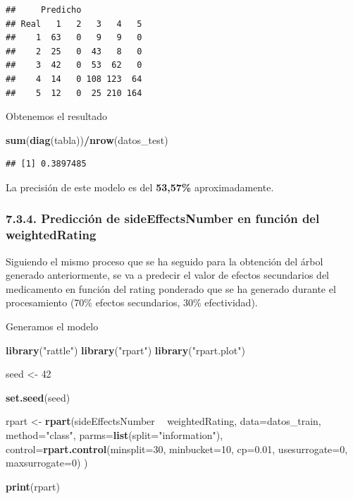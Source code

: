 \documentclass[spanish,]{article}
\newenvironment{Shaded}{\begin{snugshade}}{\end{snugshade}}
\newcommand{\KeywordTok}[1]{\textcolor[rgb]{0.13,0.29,0.53}{\textbf{#1}}}
\newcommand{\DataTypeTok}[1]{\textcolor[rgb]{0.13,0.29,0.53}{#1}}
\newcommand{\DecValTok}[1]{\textcolor[rgb]{0.00,0.00,0.81}{#1}}
\newcommand{\FloatTok}[1]{\textcolor[rgb]{0.00,0.00,0.81}{#1}}
\newcommand{\StringTok}[1]{\textcolor[rgb]{0.31,0.60,0.02}{#1}}
\newcommand{\OperatorTok}[1]{\textcolor[rgb]{0.81,0.36,0.00}{\textbf{#1}}}
\newcommand{\NormalTok}[1]{#1}
\begin{document}
\begin{verbatim}
##     Predicho
## Real   1   2   3   4   5
##    1  63   0   9   9   0
##    2  25   0  43   8   0
##    3  42   0  53  62   0
##    4  14   0 108 123  64
##    5  12   0  25 210 164
\end{verbatim}

Obtenemos el resultado

\begin{Shaded}
\begin{Highlighting}[]
\KeywordTok{sum}\NormalTok{(}\KeywordTok{diag}\NormalTok{(tabla))}\OperatorTok{/}\KeywordTok{nrow}\NormalTok{(datos_test)}
\end{Highlighting}
\end{Shaded}

\begin{verbatim}
## [1] 0.3897485
\end{verbatim}

La precisión de este modelo es del \textbf{53,57\%} aproximadamente.

\subsubsection{7.3.4. Predicción de sideEffectsNumber en función del
weightedRating}\label{prediccion-de-sideeffectsnumber-en-funcion-del-weightedrating}

Siguiendo el mismo proceso que se ha seguido para la obtención del árbol
generado anteriormente, se va a predecir el valor de efectos secundarios
del medicamento en función del rating ponderado que se ha generado
durante el procesamiento (70\% efectos secundarios, 30\% efectividad).

Generamos el modelo

\begin{Shaded}
\begin{Highlighting}[]
\KeywordTok{library}\NormalTok{(}\StringTok{"rattle"}\NormalTok{)}
\KeywordTok{library}\NormalTok{(}\StringTok{"rpart"}\NormalTok{)}
\KeywordTok{library}\NormalTok{(}\StringTok{"rpart.plot"}\NormalTok{)}

\NormalTok{seed <-}\StringTok{ }\DecValTok{42}

\KeywordTok{set.seed}\NormalTok{(seed)}

\NormalTok{rpart <-}\StringTok{ }\KeywordTok{rpart}\NormalTok{(sideEffectsNumber }\OperatorTok{~}\StringTok{ }\NormalTok{weightedRating, }\DataTypeTok{data=}\NormalTok{datos_train,}
                \DataTypeTok{method=}\StringTok{"class"}\NormalTok{,}
                \DataTypeTok{parms=}\KeywordTok{list}\NormalTok{(}\DataTypeTok{split=}\StringTok{"information"}\NormalTok{),}
                \DataTypeTok{control=}\KeywordTok{rpart.control}\NormalTok{(}\DataTypeTok{minsplit=}\DecValTok{30}\NormalTok{,}
                \DataTypeTok{minbucket=}\DecValTok{10}\NormalTok{,}
                \DataTypeTok{cp=}\FloatTok{0.01}\NormalTok{,}
                \DataTypeTok{usesurrogate=}\DecValTok{0}\NormalTok{,}
                \DataTypeTok{maxsurrogate=}\DecValTok{0}\NormalTok{)}
\NormalTok{              )}


\KeywordTok{print}\NormalTok{(rpart)}
\end{Highlighting}
\end{Shaded}
\end{document}
